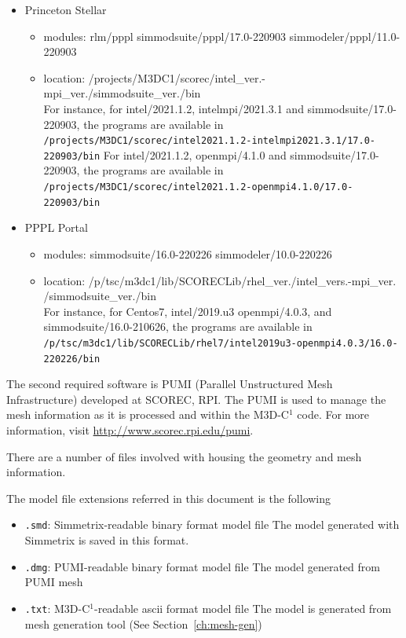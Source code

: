 \begin{itemize}
\item {Princeton Stellar}
  \begin{itemize}
  \item modules: rlm/pppl simmodsuite/pppl/17.0-220903 simmodeler/pppl/11.0-220903
  \item location: {/projects/M3DC1/scorec/intel\_ver.-mpi\_ver./simmodsuite\_ver./bin} \\
  \newline
  For instance, for intel/2021.1.2, intelmpi/2021.3.1 and simmodsuite/17.0-220903, the programs are available in 
  \newline
  \texttt{/projects/M3DC1/scorec/intel2021.1.2-intelmpi2021.3.1/17.0-220903/bin}
  \newline\newline
  For intel/2021.1.2, openmpi/4.1.0 and simmodsuite/17.0-220903, the programs are available in
  \newline
  \texttt{/projects/M3DC1/scorec/intel2021.1.2-openmpi4.1.0/17.0-220903/bin} 
  \end{itemize}
\item {PPPL Portal}
  \begin{itemize}
  \item modules: simmodsuite/16.0-220226 simmodeler/10.0-220226
  \item location: {/p/tsc/m3dc1/lib/SCORECLib/rhel\_ver./intel\_vers.-mpi\_ver. \\
	    /simmodsuite\_ver./bin} \\
  \newline
  For instance, for Centos7, intel/2019.u3 openmpi/4.0.3, and simmodsuite/16.0-210626, the programs are available in
  \newline
  \texttt{/p/tsc/m3dc1/lib/SCORECLib/rhel7/intel2019u3-openmpi4.0.3/16.0-220226/bin}
  \end{itemize}
\end{itemize}

The second required software is PUMI (Parallel Unstructured Mesh Infrastructure) developed at SCOREC, RPI. The PUMI is used to manage the mesh information as it is processed and within the M3D-C$^{1}$ code. For more information, visit \href{http://www.scorec.rpi.edu/pumi}{http://www.scorec.rpi.edu/pumi}. 

There are a number of files involved with housing the geometry and mesh information. 

The model file extensions referred in this document is the following
\begin{itemize}
\item \texttt{.smd}: Simmetrix-readable binary format model file  
\newline  The model generated with Simmetrix is saved in this format.
\item \texttt{.dmg}: PUMI-readable binary format model file
\newline	The model generated from PUMI mesh
\item	\texttt{.txt}: M3D-C$^{1}$-readable ascii format model file 
\newline	The model is generated from mesh generation tool (See Section~\ref{ch:mesh-gen})
\end{itemize}


